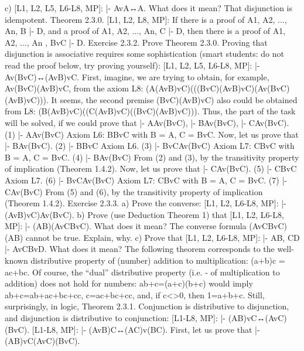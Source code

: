 c) [L1, L2, L5, L6-L8, MP]: |- AvA↔A. What does it mean? That disjunction is idempotent.
Theorem 2.3.0. [L1, L2, L8, MP]: If there is a proof of A1, A2, ..., An, B |- D, and a proof of A1, A2, ...,
An, C |- D, then there is a proof of A1, A2, ..., An , BvC |- D.
Exercise 2.3.2. Prove Theorem 2.3.0.
Proving that disjunction is associative requires some sophistication (smart students: do not read the
proof below, try proving yourself):
[L1, L2, L5, L6-L8, MP]: |- Av(BvC)↔(AvB)vC.
First, imagine, we are trying to obtain, for example, Av(BvC)\IMPLIES (AvB)vC, from the axiom L8:
(A\IMPLIES (AvB)vC)\IMPLIES (((BvC)\IMPLIES (AvB)vC)\IMPLIES (Av(BvC)\IMPLIES (AvB)vC))).
It seems, the second premise (BvC)\IMPLIES (AvB)vC) also could be obtained from L8:
(B\IMPLIES (AvB)vC)\IMPLIES ((C\IMPLIES (AvB)vC)\IMPLIES ((BvC)\IMPLIES (AvB)vC))).
Thus, the \IMPLIES  part of the task will be solved, if we could prove that |- A\IMPLIES Av(BvC), |- B\IMPLIES Av(BvC), |-
C\IMPLIES Av(BvC).
(1) |- A\IMPLIES Av(BvC)
Axiom L6: B\IMPLIES BvC with B = A, C = BvC.
Now, let us prove that |- B\IMPLIES Av(BvC).
(2) |- B\IMPLIES BvC Axiom L6.
(3) |- BvC\IMPLIES Av(BvC) Axiom L7: C\IMPLIES BvC with B = A, C = BvC.
(4) |- B\IMPLIES Av(BvC) From (2) and (3), by the transitivity property
                  of implication (Theorem 1.4.2).
Now, let us prove that |- C\IMPLIES Av(BvC).
(5) |- C\IMPLIES BvC Axiom L7.
(6) |- BvC\IMPLIES Av(BvC) Axiom L7: C\IMPLIES BvC with B = A, C = BvC.
(7) |- C\IMPLIES Av(BvC) From (5) and (6), by the transitivity property
                  of implication (Theorem 1.4.2).
Exercise 2.3.3. a) Prove the converse: [L1, L2, L6-L8, MP]: |- (AvB)vC)\IMPLIES Av(BvC).
b) Prove (use Deduction Theorem 1) that [L1, L2, L6-L8, MP]: |- (A\IMPLIES B)\IMPLIES (AvC\IMPLIES BvC). What does it
mean? The converse formula (AvC\IMPLIES BvC)\IMPLIES (A\IMPLIES B) cannot be true. Explain, why.
c) Prove that [L1, L2, L6-L8, MP]: |- A\IMPLIES B, C\IMPLIES D |- AvC\IMPLIES BvD. What does it mean?
The following theorem corresponds to the well-known distributive property of (number) addition to
multiplication: (a+b)c = ac+bc. Of course, the ``dual'' distributive property (i.e. - of multiplication to
addition) does not hold for numbers: ab+c=(a+c)(b+c) would imply ab+c=ab+ac+bc+cc, c=ac+bc+cc,
and, if c<>0, then 1=a+b+c. Still, surprisingly, in logic,
Theorem 2.3.1. Conjunction is distributive to disjunction, and disjunction is distributive to
conjunction:
[L1-L8, MP]: |- (A\AND B)vC↔(AvC)\AND (BvC).
[L1-L8, MP]: |- (AvB)\AND C↔(A\AND C)v(B\AND C).
First, let us prove that |- (A\AND B)vC\IMPLIES (AvC)\AND (BvC).
